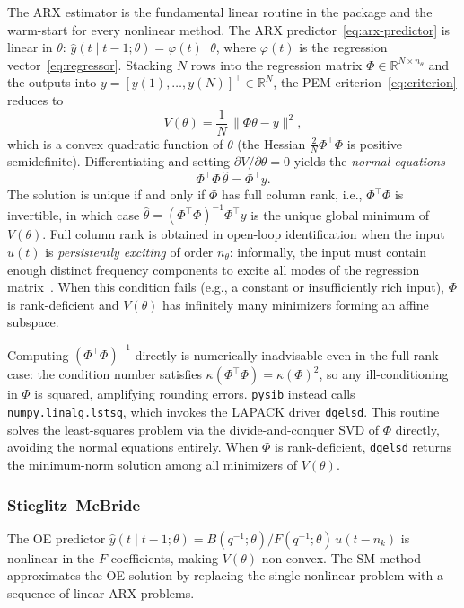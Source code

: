\documentclass{ifacconf}
\begin{document}
The ARX estimator is the fundamental linear routine in the package and the
warm-start for every nonlinear method.
The ARX predictor~\eqref{eq:arx-predictor} is linear in $\theta$:
$\hat{y}(t \mid t-1;\theta) = \varphi(t)^\top\theta$,
where $\varphi(t)$ is the regression vector~\eqref{eq:regressor}.
Stacking $N$ rows into the regression matrix
$\Phi \in \mathbb{R}^{N \times n_\theta}$ and the outputs into
$y = [y(1),\ldots,y(N)]^\top \in \mathbb{R}^N$,
the PEM criterion~\eqref{eq:criterion} reduces to
\[
    V(\theta) = \frac{1}{N}\,\|\Phi\theta - y\|^2,
\]
which is a convex quadratic function of $\theta$ (the Hessian
$\frac{2}{N}\Phi^\top\Phi$ is positive semidefinite).
Differentiating and setting $\partial V/\partial\theta = 0$ yields the
\emph{normal equations}
\[
    \Phi^\top\Phi\,\hat\theta = \Phi^\top y.
\]
The solution is unique if and only if $\Phi$ has full column rank, i.e.,
$\Phi^\top\Phi$ is invertible, in which case
$\hat\theta = (\Phi^\top\Phi)^{-1}\Phi^\top y$ is the unique global
minimum of $V(\theta)$.  Full column rank is obtained in open-loop identification when the input
$u(t)$ is \emph{persistently exciting} of order $n_\theta$: informally,
the input must contain enough distinct frequency components to excite all
modes of the regression matrix~\cite{ljung1999}.  When this condition
fails (e.g., a constant or insufficiently rich input), $\Phi$ is
rank-deficient and $V(\theta)$ has infinitely many minimizers forming an
affine subspace.

Computing $(\Phi^\top\Phi)^{-1}$ directly is numerically inadvisable
even in the full-rank case: the condition number satisfies
$\kappa(\Phi^\top\Phi) = \kappa(\Phi)^2$, so any ill-conditioning in
$\Phi$ is squared, amplifying rounding errors.  \texttt{pysib} instead
calls \texttt{numpy.linalg.lstsq}, which invokes the LAPACK driver
\texttt{dgelsd}.  This routine solves the least-squares problem via the
divide-and-conquer SVD of $\Phi$ directly, avoiding the normal equations
entirely.  When $\Phi$ is rank-deficient, \texttt{dgelsd} returns the
minimum-norm solution among all minimizers of $V(\theta)$.

\subsubsection{Stieglitz--McBride}
\label{subsubsec:sm}

The OE predictor $\hat{y}(t \mid t-1;\theta) = B(q^{-1};\theta)/F(q^{-1};\theta)\,u(t-n_k)$
is nonlinear in the $F$ coefficients, making $V(\theta)$ non-convex.
The SM method approximates the OE solution by replacing the single
nonlinear problem with a sequence of linear ARX problems.
\end{document}
